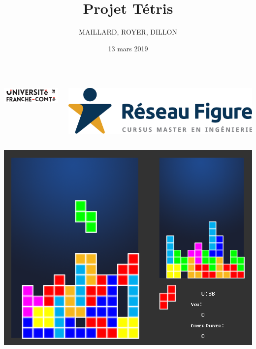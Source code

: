 \documentclass[french]{beamer}
\title{Projet Tétris}
\author{MAILLARD, ROYER, DILLON}
\date{13 mars 2019}
\begin{document}


\begin{frame}

	\begin{columns}

		\hspace{-2.5cm}
		\begin{column}{0.2\textwidth}
			\includegraphics[scale=0.3]{img/logU.png}
	
		\end{column}
		
		\begin{column}{0.2\textwidth}
			\vspace{0.1cm}
			\includegraphics[scale=0.045]{img/logF.jpg}

		\end{column}

	\end{columns}

	\vspace{-0.15cm}


	\vspace{-0.5cm}


	\includegraphics[scale=0.125]{img/vouitris.png}


\end{frame}
\end{document}
